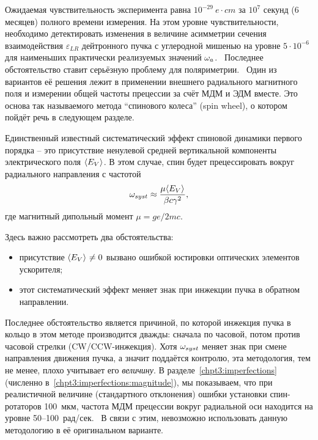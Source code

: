 Ожидаемая чувствительность эксперимента равна $10^{-29}~e\cdot cm$ за $10^7$
секунд (6 месяцев) полного времени измерения. На этом уровне
чувствительности, необходимо детектировать изменения в величине 
асимметрии сечения взаимодействия $\varepsilon_{LR}$  
дейтронного пучка с углеродной мишенью на уровне 
$5\cdot10^{-6}$ для наименьших практически реализуемых значений
$\omega_a$.~\cite[стр.~18]{BNL:Deuteron2008} Последнее обстоятельство
ставит серьёзную проблему для поляриметрии.~\cite[стр.~6]{Mane:SpinWheel} Один
из вариантов её решения лежит в применении внешнего радиального
магнитного поля и измерении общей частоты прецессии за счёт МДМ и ЭДМ
вместе. Это основа так называемого метода ``спинового колеса'' (spin wheel), 
о котором пойдёт речь в следующем разделе. 

Единственный известный систематический эффект спиновой динамики
первого порядка -- это присутствие ненулевой средней вертикальной
компоненты электрического поля $\avg{E_V}$. В этом случае, спин будет
прецессировать вокруг радиального направления с частотой~\cite[стр.~11]{BNL:Deuteron2008}
\begin{equation}\label{eq:BNL:main-syst-error}
\w_{syst} \approx \frac{\mu\avg{E_V}}{\beta c\gamma^2},
\end{equation}
где магнитный дипольный момент $\mu = ge/2mc$.

Здесь важно рассмотреть два обстоятельства:
\begin{itemize}
\item присутствие $\avg{E_V}\neq 0$ вызвано ошибкой юстировки оптических
  элементов ускорителя;
\item этот систематический эффект меняет знак при инжекции пучка в
  обратном направлении.
\end{itemize}
Последнее обстоятельство является причиной, по которой инжекция пучка
в кольцо в этом методе производится дважды: сначала по часовой, потом
против часовой стрелки (CW/CCW-инжекция). Хотя $\omega_{syst}$ меняет знак при смене
направления движения пучка, а значит поддаётся контролю, эта методология, тем не менее,
плохо учитывает его \emph{величину}. В разделе~\ref{chpt3:imperfections} 
(численно в~\ref{chpt3:imperfections:magnitude}), мы показываем, что при реалистичной величине 
(стандартного отклонения) ошибки установки спин-ротаторов 100~мкм, 
частота МДМ прецессии вокруг радиальной оси находится на уровне 50--100~рад/сек.~\cite{Senichev:FDM} 
В связи с этим, невозможно использовать данную методологию в её оригинальном варианте.